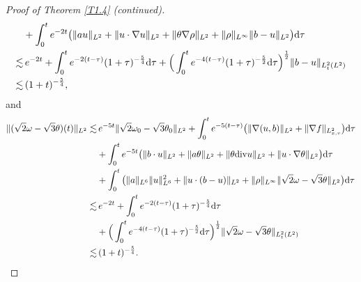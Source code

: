 \documentclass[reqno,11pt]{amsart}
\theoremstyle{plain}
\numberwithin{equation}{section}
\begin{document}
\begin{proof}[Proof of Theorem \ref{T1.4} \emph{(}continued\emph{)}]
\begin{align}
&+\int_0^t e^{-2t}\big(\|au\|_{L^2}+\|u\cdot\nabla u\|_{L^2}
+\|\theta\nabla\rho\|_{L^2}+\|\rho\|_{L^\infty}\|b-u\|_{L^2}  \big){\rm d}\tau \nonumber\\
\lesssim&\, e^{-2t}+\int_0^t e^{-2(t-\tau)}(1+\tau)^{-\frac{5}{4}}{\rm d}\tau 
+\Big(\int_0^t e^{-4(t-\tau)}(1+\tau)^{-\frac{5}{2}}{\rm d}\tau\Big)^\frac{1}{2}\|b-u\|_{L_t^2(L^2)}\nonumber\\
\lesssim&\, (1+t)^{-\frac{5}{4}},
\end{align}
and
\begin{align}\label{NJKG3.163}
\|(\sqrt{2}\omega-\sqrt{3}\theta)(t)\|_{L^2}\lesssim&\, e^{-5t} \|\sqrt{2}\omega_0
-\sqrt{3}\theta_0\|_{L^2}+\int_0^t e^{-5(t-\tau)}\big(\|\nabla(u,b)\|_{L^2}
+\|\nabla f\|_{L_{x,v}^2}\big)  {\rm d}\tau\nonumber\\
&+\int_0^t e^{-5t}\big(\|b\cdot
 u\|_{L^2}+\|a\theta\|_{L^2}+\|\theta{\rm div} u\|_{L^2}+\|u\cdot\nabla\theta\|_{L^2} 
 \big){\rm d}\tau \nonumber\\
&+\int_0^t\big(  \|a\|_{L^6}\|u\|_{L^6}^2+\|u\cdot(b-u)\|_{L^2}  
+\|\rho\|_{L^\infty}\| \sqrt{2}\omega-\sqrt{3}\theta \|_{L^2} \big)
  {\rm d}\tau\nonumber\\
\lesssim&\, e^{-2t}+\int_0^t e^{-2(t-\tau)}(1+\tau)^{-\frac{5}{4}}{\rm d}\tau \nonumber\\
&+\Big(\int_0^t e^{-4(t-\tau)}(1+\tau)^{-\frac{5}{2}}{\rm d}\tau\Big)^\frac{1}{2}
\|\sqrt{2}\omega-\sqrt{3}\theta\|_{L_t^2(L^2)}\nonumber\\
\lesssim&\, (1+t)^{-\frac{5}{4}}.
\end{align}


\end{proof}
\end{document}
